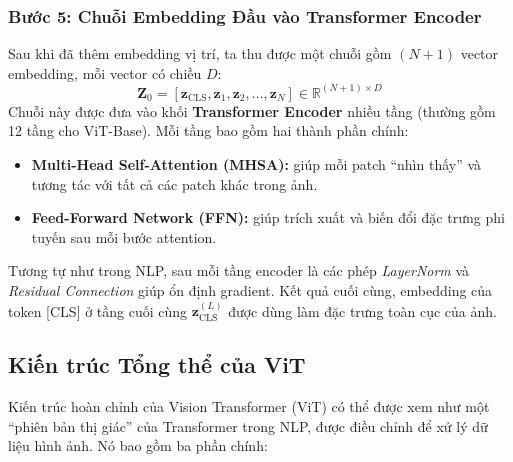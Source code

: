 \subsubsection{Bước 5: Chuỗi Embedding Đầu vào Transformer Encoder}
\label{subsubsec:vit_input_to_encoder}
Sau khi đã thêm embedding vị trí, ta thu được một chuỗi gồm $(N + 1)$ vector embedding, mỗi vector có chiều $D$:
\begin{equation}
	\mathbf{Z}_0 = [\mathbf{z}_{\text{CLS}}, \mathbf{z}_1, \mathbf{z}_2, \dots, \mathbf{z}_N] \in \mathbb{R}^{(N+1) \times D}
\end{equation}
Chuỗi này được đưa vào khối \textbf{Transformer Encoder} nhiều tầng (thường gồm 12 tầng cho ViT-Base).  
Mỗi tầng bao gồm hai thành phần chính:
\begin{itemize}
	\item \textbf{Multi-Head Self-Attention (MHSA):} giúp mỗi patch “nhìn thấy” và tương tác với tất cả các patch khác trong ảnh.
	\item \textbf{Feed-Forward Network (FFN):} giúp trích xuất và biến đổi đặc trưng phi tuyến sau mỗi bước attention.
\end{itemize}
Tương tự như trong NLP, sau mỗi tầng encoder là các phép \textit{LayerNorm} và \textit{Residual Connection} giúp ổn định gradient.  
Kết quả cuối cùng, embedding của token [CLS] ở tầng cuối cùng $\mathbf{z}_{\text{CLS}}^{(L)}$ được dùng làm đặc trưng toàn cục của ảnh.

\subsection{Kiến trúc Tổng thể của ViT}
\label{subsec:vit_full_architecture}
Kiến trúc hoàn chỉnh của Vision Transformer (ViT) có thể được xem như một “phiên bản thị giác” của Transformer trong NLP, được điều chỉnh để xử lý dữ liệu hình ảnh. Nó bao gồm ba phần chính:

